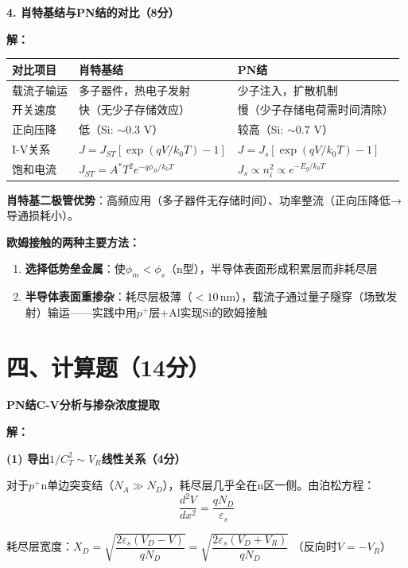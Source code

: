 \documentclass[12pt,a4paper]{ctexart}
\begin{document}
\noindent\textbf{4. 肖特基结与PN结的对比（8分）}

\textbf{解：}\quad

\begin{center}
\begin{tabular}{p{3cm}|p{5cm}|p{5cm}}
\toprule
\textbf{对比项目} & \textbf{肖特基结} & \textbf{PN结} \\
\midrule
载流子输运 & 多子器件，热电子发射 & 少子注入，扩散机制 \\
开关速度 & 快（无少子存储效应） & 慢（少子存储电荷需时间清除） \\
正向压降 & 低（Si: $\sim 0.3$ V） & 较高（Si: $\sim 0.7$ V） \\
I-V关系 & $J = J_{ST}[\exp(qV/k_0T)-1]$ & $J = J_s[\exp(qV/k_0T)-1]$ \\
饱和电流 & $J_{ST} = A^*T^2e^{-q\phi_B/k_0T}$ & $J_s \propto n_i^2 \propto e^{-E_g/k_0T}$ \\
\bottomrule
\end{tabular}
\end{center}

\textbf{肖特基二极管优势}：高频应用（多子器件无存储时间）、功率整流（正向压降低→导通损耗小）。

\textbf{欧姆接触的两种主要方法：}
\begin{enumerate}[nosep]
\item \textbf{选择低势垒金属}：使$\phi_m < \phi_s$（n型），半导体表面形成积累层而非耗尽层
\item \textbf{半导体表面重掺杂}：耗尽层极薄（$<10\,\text{nm}$），载流子通过量子隧穿（场致发射）输运——实践中用$p^+$层+Al实现Si的欧姆接触
\end{enumerate}

\newpage

\section*{四、计算题（14分）}

\noindent\textbf{PN结C-V分析与掺杂浓度提取}

\vspace{4pt}

\textbf{解：}

\noindent\textbf{(1) 导出$1/C_T^2 \sim V_R$线性关系（4分）}

对于$p^+$n单边突变结（$N_A \gg N_D$），耗尽层几乎全在n区一侧。由泊松方程：
\[
\frac{d^2V}{dx^2} = \frac{qN_D}{\varepsilon_s}
\]

耗尽层宽度：$X_D = \sqrt{\dfrac{2\varepsilon_s(V_D - V)}{qN_D}} = \sqrt{\dfrac{2\varepsilon_s(V_D + V_R)}{qN_D}}$ （反向时$V = -V_R$）
\end{document}
